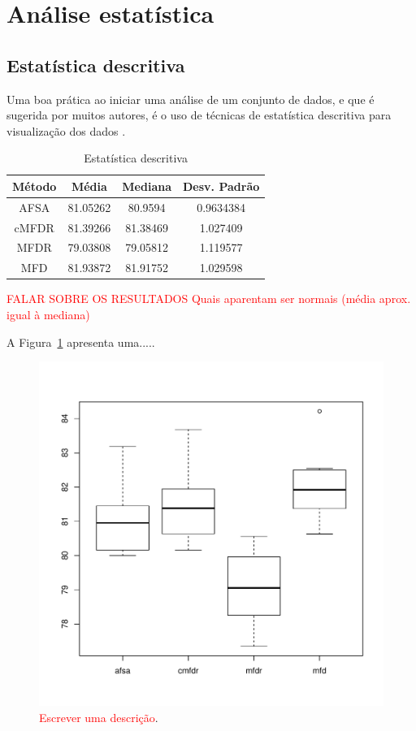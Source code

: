 \documentclass[conference]{IEEEtran}
\begin{document}
\section{Análise estatística}
\label{sec:analise}

\subsection{Estatística descritiva}

Uma boa prática ao iniciar uma análise de um conjunto de dados, e que é sugerida por muitos autores, é o uso de técnicas de estatística descritiva para visualização dos dados \cite{montgomery2010applied}.

\begin{table}[h]
	\centering
	\caption{Estatística descritiva}
	\label{tab:est_descr}
	\begin{tabular}{cccc}
		Método    & Média  & Mediana & Desv. Padrão  \\
		\hline
		AFSA&		81.05262 	& 80.9594 	& 0.9634384 \\
		cMFDR&      81.39266 	& 81.38469 	& 1.027409 \\
		MFDR& 		79.03808 	& 79.05812 	& 1.119577 \\
		MFD&     	81.93872 	& 81.91752 	& 1.029598 \\
		\hline
	\end{tabular}
\end{table}

\textcolor{red}{FALAR SOBRE OS RESULTADOS
Quais aparentam ser normais (média aprox. igual à mediana)
}


A Figura~\ref{fig:boxplot} apresenta uma.....

\begin{figure}[h]
	\centering
	\includegraphics[width=\linewidth]{img/boxplot.pdf}
	\caption{\textcolor{red}{Escrever uma descrição}.}
	\label{fig:boxplot}
\end{figure}
\end{document}
